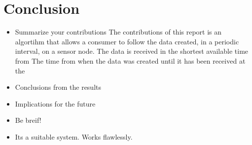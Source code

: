 \section{Conclusion}

\begin{itemize}
\item Summarize your contributions
The contributions of this report is an algortihm that allows a consumer to follow the data created, in a periodic interval, on a sensor node. 
The data is received in the shortest available time from 
The time from when the data was created until it has been received at the 

\item Conclusions from the results
\item Implications for the future 
\item Be breif!

\item Its a suitable system. Works flawlessly.
\end{itemize}

